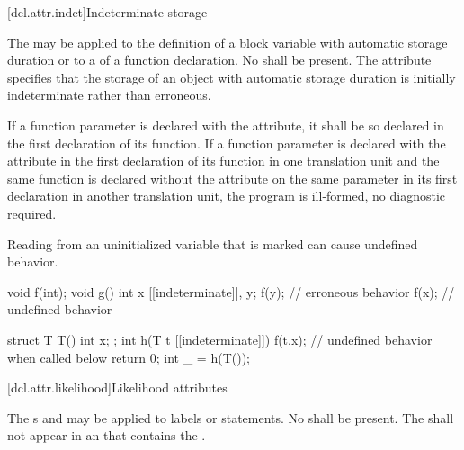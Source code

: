 [dcl.attr.indet]{Indeterminate storage}

\pnum
The   may be applied
to the definition of a block variable with automatic storage duration or
to a  of a function declaration.
No  shall be present.
The attribute specifies
that the storage of an object with automatic storage duration
is initially indeterminate rather than erroneous.

\pnum
If a function parameter is declared with the  attribute,
it shall be so declared in the first declaration of its function.
If a function parameter is declared with
the  attribute in the first declaration of its function
in one translation unit and
the same function is declared without the  attribute
on the same parameter in its first declaration in another translation unit,
the program is ill-formed, no diagnostic required.

\pnum
\begin{note}
Reading from an uninitialized variable
that is marked \tcode{[[indeterminate]]} can cause undefined behavior.
\begin{codeblock}
void f(int);
void g() {
  int x [[indeterminate]], y;
  f(y);                 // erroneous behavior
  f(x);                 // undefined behavior
}

struct T {
  T() {}
  int x;
};
int h(T t [[indeterminate]]) {
  f(t.x);               // undefined behavior when called below
  return 0;
}
int _ = h(T());
\end{codeblock}
\end{note}

[dcl.attr.likelihood]{Likelihood attributes}%

\pnum
The s
 and 
may be applied to labels or statements.
No  shall be present.
The  
shall not appear in an 
that contains the  .

